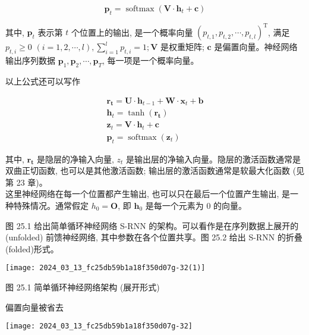 \documentclass[10pt]{article}
\begin{document}
\begin{equation*}
\boldsymbol{p}_{t}=\operatorname{softmax}\left(\boldsymbol{V} \cdot \boldsymbol{h}_{t}+\boldsymbol{c}\right) \tag{25.2}
\end{equation*}


其中, $\boldsymbol{p}_{t}$ 表示第 $t$ 个位置上的输出, 是一个概率向量 $\left(p_{t, 1}, p_{t, 2}, \cdots, p_{t, l}\right)^{\mathrm{T}}$, 满足 $p_{t, i} \geqslant 0$ $(i=1,2, \cdots, l), \sum_{i=1}^{l} p_{t, i}=1 ; \boldsymbol{V}$ 是权重矩阵; $\boldsymbol{c}$ 是偏置向量。神经网络输出序列数据 $\boldsymbol{p}_{1}, \boldsymbol{p}_{2}, \cdots, \boldsymbol{p}_{T}$, 每一项是一个概率向量。

以上公式还可以写作


\begin{gather*}
\boldsymbol{r}_{\boldsymbol{t}}=\boldsymbol{U} \cdot \boldsymbol{h}_{t-1}+\boldsymbol{W} \cdot \boldsymbol{x}_{t}+\boldsymbol{b}  \tag{25.3}\\
\boldsymbol{h}_{t}=\tanh \left(\boldsymbol{r}_{\boldsymbol{t}}\right)  \tag{25.4}\\
\boldsymbol{z}_{t}=\boldsymbol{V} \cdot \boldsymbol{h}_{t}+\boldsymbol{c}  \tag{https://cdn.mathpix.com/cropped/2024_03_13_fc25db59b1a18f350d07g-31.jpg?height=164&width=302&top_left_y=7257&top_left_x=5219}\\
\boldsymbol{p}_{t}=\operatorname{softmax}\left(\boldsymbol{z}_{t}\right) \tag{25.6}
\end{gather*}


其中, $\boldsymbol{r}_{\boldsymbol{t}}$ 是隐层的净输入向量, $z_{t}$ 是输出层的净输入向量。隐层的激活函数通常是双曲正切函数, 也可以是其他激活函数; 输出层的激活函数通常是软最大化函数 (见第 23 章)。\\
这里神经网络在每一个位置都产生输出, 也可以只在最后一个位置产生输出, 是一种特殊情况。通常假定 $h_{0}=\boldsymbol{O}$, 即 $\boldsymbol{h}_{0}$ 是每一个元素为 0 的向量。

图 25.1 给出简单循环神经网络 S-RNN 的架构。可以看作是在序列数据上展开的 (unfolded) 前馈神经网络, 其中参数在各个位置共享。图 25.2 给出 S-RNN 的折叠 (folded)形式。

\begin{center}
\texttt{[image: 2024\_03\_13\_fc25db59b1a18f350d07g-32(1)]}
\end{center}

图 25.1 简单循环神经网络架构 (展开形式)

偏置向量被省去

\begin{center}
\texttt{[image: 2024\_03\_13\_fc25db59b1a18f350d07g-32]}
\end{center}
\end{document}

